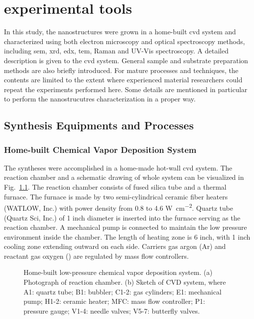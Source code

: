 
\chapter{experimental tools}

In this study, the nanostructures were grown in a home-built \gls{cvd} system and characterized using both electron microscopy and optical spectroscopy methods, including \gls{sem}, \gls{xrd}, \gls{edx}, \gls{tem}, Raman and UV-Vis spectroscopy. A detailed description is given to the \gls{cvd} system. General sample and substrate preparation methods are also briefly introduced. For mature processes and techniques, the contents are limited to the extent where experienced material researchers could repeat the experiments performed here. Some details are mentioned in particular to perform the nanostrucutres characterization in a proper way. 

\section{Synthesis Equipments and Processes}
\subsection{Home-built Chemical Vapor Deposition System}
The syntheses were accomplished in a home-made hot-wall \gls{cvd} system. The reaction chamber and a schematic drawing of whole system can be visualized in Fig.~\ref{fig:ch2cvd}. The reaction chamber consists of fused silica tube and a thermal furnace. The furnace is made by two semi-cylindrical ceramic fiber heaters (WATLOW, Inc.) with power density from 0.8 to 4.6 \si{W cm^{-2}}. Quartz tube (Quartz Sci, Inc.) of 1 inch diameter is inserted into the furnace serving as the reaction chamber. A mechanical pump is connected to maintain the low pressure environment inside the chamber. The length of heating zone is 6 inch, with 1 inch cooling zone extending outward on each side. Carriers gas argon (Ar) and reactant gas oxygen () are regulated by mass flow controllers.

\begin{figure}[htb]
\centering
{}

\caption[Home-built low-pressure chemical vapor deposition system]{Home-built low-pressure chemical vapor deposition system. (a) Photograph of reaction chamber. (b) Sketch of CVD system, where A1: quartz tube; B1: bubbler; C1-2: gas cylinders; E1: mechanical pump; H1-2: ceramic heater; MFC: mass flow controller; P1: pressure gauge; V1-4: needle valves; V5-7: butterfly valves.}
\label{fig:ch2cvd}
\end{figure}

